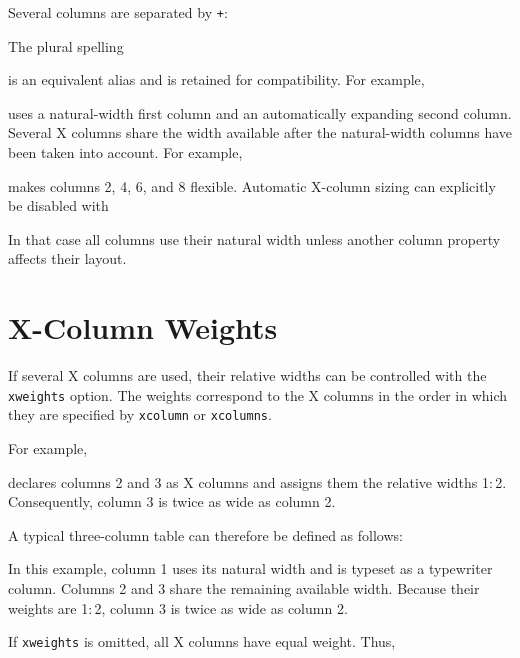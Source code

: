 \documentclass[
11pt,
a4paper,
oneside
]{scrbook}
\begin{document}


Several columns are separated by \texttt{+}:




The plural spelling




is an equivalent alias and is retained for compatibility.
For example,




uses a natural-width first column and an automatically expanding second
column.
Several X columns share the width available after the natural-width columns
have been taken into account. For example,




makes columns 2, 4, 6, and 8 flexible.
Automatic X-column sizing can explicitly be disabled with




In that case all columns use their natural width unless another column
property affects their layout.

\section{X-Column Weights}

If several X columns are used, their relative widths can be controlled with
the \texttt{xweights} option. The weights correspond to the X columns in the
order in which they are specified by \texttt{xcolumn} or \texttt{xcolumns}.

For example,




declares columns 2 and 3 as X columns and assigns them the relative widths
1:\,2. Consequently, column 3 is twice as wide as column 2.

A typical three-column table can therefore be defined as follows:




In this example, column 1 uses its natural width and is typeset as a
typewriter column. Columns 2 and 3 share the remaining available width.
Because their weights are 1:\,2, column 3 is twice as wide as
column 2.

If \texttt{xweights} is omitted, all X columns have equal weight. Thus,
\end{document}
